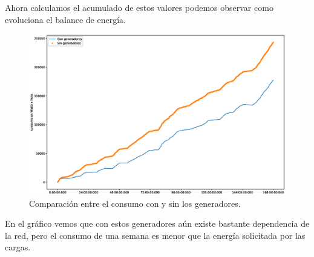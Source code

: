 Ahora calculamos el acumulado de estos valores podemos observar como evoluciona el
balance de energía. 

\begin{figure}[H]
    \centering
    \includegraphics[scale=0.3]{images/compWW.eps}
    \caption{Comparación entre el consumo con y sin los generadores.}
\end{figure}

En el gráfico vemos que con estos generadores aún existe bastante dependencia de la red,
pero el consumo de una semana es menor que la energía solicitada por las cargas.